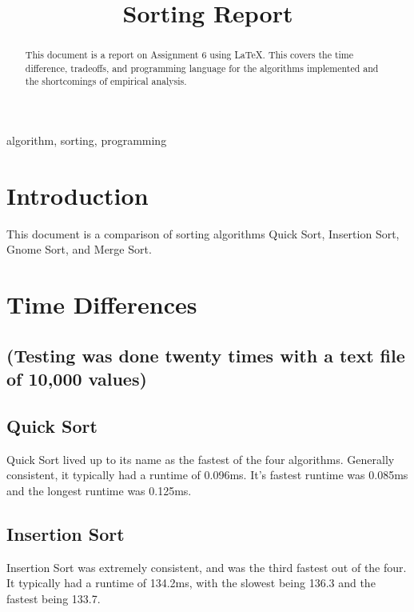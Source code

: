 \documentclass[conference]{IEEEtran}
\begin{document}
\title{Sorting Report\\}


\author{
}

\maketitle

\begin{abstract}
This document is a report on Assignment 6 using \LaTeX.
This covers the time difference, tradeoffs, and programming language for the algorithms implemented and the shortcomings of empirical analysis.
\end{abstract}

\begin{IEEEkeywords}
algorithm, sorting, programming
\end{IEEEkeywords}

\section{Introduction}
This document is a comparison of sorting algorithms Quick Sort, Insertion Sort, Gnome Sort, and Merge Sort.

\section{Time Differences}

\subsection*{(Testing was done twenty times with a text file of 10,000 values)}

\subsection{Quick Sort}

Quick Sort lived up to its name as the fastest of the four algorithms. Generally consistent, it typically had a runtime of 0.096ms. It's fastest runtime was 0.085ms and the longest runtime was 0.125ms.

\subsection{Insertion Sort}
Insertion Sort was extremely consistent, and was the third fastest out of the four. It typically had a runtime of 134.2ms, with the slowest being 136.3 and the fastest being 133.7.
\end{document}
